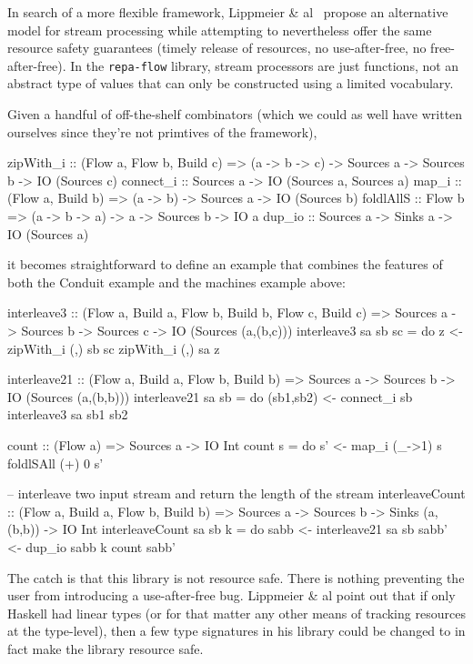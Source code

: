 \documentclass[11pt]{article}
\begin{document}
In search of a more flexible framework, Lippmeier \&
al~\cite{lippmeier_parallel_2016} propose an alternative model for
stream processing while attempting to nevertheless offer the same
resource safety guarantees (timely release of resources, no
use-after-free, no free-after-free). In the \verb+repa-flow+ library,
stream processors are just functions, not an abstract type of values
that can only be constructed using a limited vocabulary.

Given a handful of off-the-shelf combinators (which we could as well
have written ourselves since they're not primtives of the framework),
\begin{code}
zipWith_i :: (Flow a, Flow b, Build c)
          => (a -> b -> c) -> Sources a -> Sources b -> IO (Sources c)
connect_i :: Sources a -> IO (Sources a, Sources a)
map_i :: (Flow a, Build b) => (a -> b) -> Sources a -> IO (Sources b)
foldlAllS :: Flow b => (a -> b -> a) -> a -> Sources b -> IO a
dup_io :: Sources a -> Sinks a -> IO (Sources a)
\end{code}
it becomes straightforward to define an example that combines the
features of both the Conduit example and the machines example above:
\begin{code}
interleave3
    :: (Flow a, Build a, Flow b, Build b, Flow c, Build c)
    => Sources a -> Sources b -> Sources c -> IO (Sources (a,(b,c)))
interleave3 sa sb sc = do
    z <- zipWith_i (,) sb sc
    zipWith_i (,) sa z

interleave21
    :: (Flow a, Build a, Flow b, Build b)
    => Sources a -> Sources b -> IO (Sources (a,(b,b)))
interleave21 sa sb = do
    (sb1,sb2) <- connect_i sb
    interleave3 sa sb1 sb2

count :: (Flow a) => Sources a -> IO Int
count s = do
  s' <- map_i (\_->1) s
  foldlSAll (+) 0 s'

-- interleave two input stream and return the length of the stream
interleaveCount
    :: (Flow a, Build a, Flow b, Build b)
     => Sources a -> Sources b -> Sinks (a,(b,b)) -> IO Int
interleaveCount sa sb k = do
  sabb <- interleave21 sa sb
  sabb' <- dup_io sabb k
  count sabb'
\end{code} %
The catch is that this library is not resource safe. There is nothing
preventing the user from introducing a use-after-free bug. Lippmeier
\& al point out that if only Haskell had linear types (or for that
matter any other means of tracking resources at the type-level), then
a few type signatures in his library could be changed to in fact make
the library resource safe.
\end{document}
